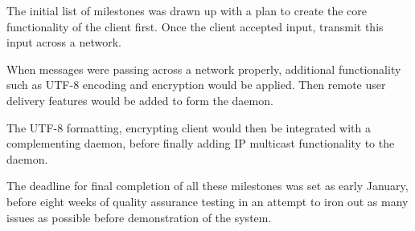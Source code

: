 
The initial list of milestones was drawn up with a plan to create the
core functionality of the client first. Once the client accepted input,
transmit this input across a network.


When messages were passing across a network properly, additional
functionality such as UTF-8 encoding and encryption would be applied.
Then remote user delivery features would be added to form the daemon.


The UTF-8 formatting, encrypting client would then be integrated with a
complementing daemon, before finally adding IP multicast functionality
to the daemon.


The deadline for final completion of all these milestones was set as
early January, before eight weeks of quality assurance testing in an
attempt to iron out as many issues as possible before demonstration of
the system. 

